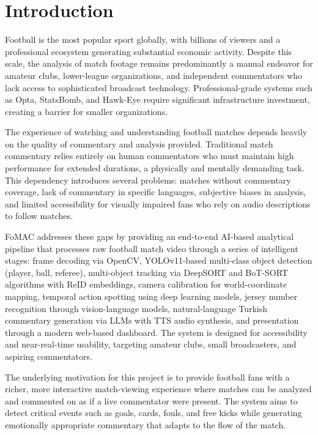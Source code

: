 \documentclass[10pt,twocolumn,a4paper]{article}
\begin{document}
\section{Introduction}

Football is the most popular sport globally, with billions of viewers and a professional ecosystem generating substantial economic activity. Despite this scale, the analysis of match footage remains predominantly a manual endeavor for amateur clubs, lower-league organizations, and independent commentators who lack access to sophisticated broadcast technology. Professional-grade systems such as Opta, StatsBomb, and Hawk-Eye require significant infrastructure investment, creating a barrier for smaller organizations.

The experience of watching and understanding football matches depends heavily on the quality of commentary and analysis provided. Traditional match commentary relies entirely on human commentators who must maintain high performance for extended durations, a physically and mentally demanding task. This dependency introduces several problems: matches without commentary coverage, lack of commentary in specific languages, subjective biases in analysis, and limited accessibility for visually impaired fans who rely on audio descriptions to follow matches.

FoMAC addresses these gaps by providing an end-to-end AI-based analytical pipeline that processes raw football match video through a series of intelligent stages: frame decoding via OpenCV, YOLOv11-based multi-class object detection (player, ball, referee), multi-object tracking via DeepSORT and BoT-SORT algorithms with ReID embeddings, camera calibration for world-coordinate mapping, temporal action spotting using deep learning models, jersey number recognition through vision-language models, natural-language Turkish commentary generation via LLMs with TTS audio synthesis, and presentation through a modern web-based dashboard. The system is designed for accessibility and near-real-time usability, targeting amateur clubs, small broadcasters, and aspiring commentators.

The underlying motivation for this project is to provide football fans with a richer, more interactive match-viewing experience where matches can be analyzed and commented on as if a live commentator were present. The system aims to detect critical events such as goals, cards, fouls, and free kicks while generating emotionally appropriate commentary that adapts to the flow of the match.
\end{document}
